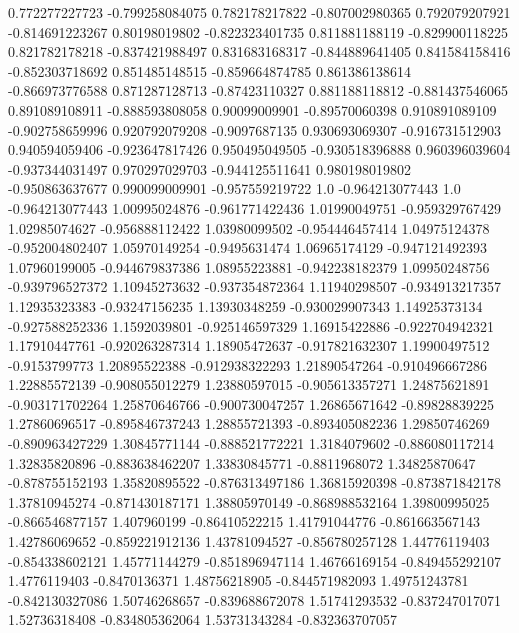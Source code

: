  0.772277227723  -0.799258084075
 0.782178217822  -0.807002980365
 0.792079207921  -0.814691223267
  0.80198019802  -0.822323401735
 0.811881188119  -0.829900118225
 0.821782178218  -0.837421988497
 0.831683168317  -0.844889641405
 0.841584158416  -0.852303718692
 0.851485148515  -0.859664874785
 0.861386138614  -0.866973776588
 0.871287128713   -0.87423110327
 0.881188118812  -0.881437546065
 0.891089108911  -0.888593808058
  0.90099009901   -0.89570060398
 0.910891089109  -0.902758659996
 0.920792079208    -0.9097687135
 0.930693069307  -0.916731512903
 0.940594059406  -0.923647817426
 0.950495049505  -0.930518396888
 0.960396039604  -0.937344031497
 0.970297029703  -0.944125511641
 0.980198019802  -0.950863637677
 0.990099009901  -0.957559219722
            1.0  -0.964213077443
            1.0  -0.964213077443
  1.00995024876  -0.961771422436
  1.01990049751  -0.959329767429
  1.02985074627  -0.956888112422
  1.03980099502  -0.954446457414
  1.04975124378  -0.952004802407
  1.05970149254    -0.9495631474
  1.06965174129  -0.947121492393
  1.07960199005  -0.944679837386
  1.08955223881  -0.942238182379
  1.09950248756  -0.939796527372
  1.10945273632  -0.937354872364
  1.11940298507  -0.934913217357
  1.12935323383   -0.93247156235
  1.13930348259  -0.930029907343
  1.14925373134  -0.927588252336
   1.1592039801  -0.925146597329
  1.16915422886  -0.922704942321
  1.17910447761  -0.920263287314
  1.18905472637  -0.917821632307
  1.19900497512    -0.9153799773
  1.20895522388  -0.912938322293
  1.21890547264  -0.910496667286
  1.22885572139  -0.908055012279
  1.23880597015  -0.905613357271
  1.24875621891  -0.903171702264
  1.25870646766  -0.900730047257
  1.26865671642   -0.89828839225
  1.27860696517  -0.895846737243
  1.28855721393  -0.893405082236
  1.29850746269  -0.890963427229
  1.30845771144  -0.888521772221
   1.3184079602  -0.886080117214
  1.32835820896  -0.883638462207
  1.33830845771    -0.8811968072
  1.34825870647  -0.878755152193
  1.35820895522  -0.876313497186
  1.36815920398  -0.873871842178
  1.37810945274  -0.871430187171
  1.38805970149  -0.868988532164
  1.39800995025  -0.866546877157
    1.407960199   -0.86410522215
  1.41791044776  -0.861663567143
  1.42786069652  -0.859221912136
  1.43781094527  -0.856780257128
  1.44776119403  -0.854338602121
  1.45771144279  -0.851896947114
  1.46766169154  -0.849455292107
   1.4776119403    -0.8470136371
  1.48756218905  -0.844571982093
  1.49751243781  -0.842130327086
  1.50746268657  -0.839688672078
  1.51741293532  -0.837247017071
  1.52736318408  -0.834805362064
  1.53731343284  -0.832363707057
